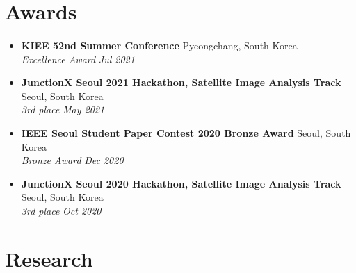\documentclass[10pt]{article}
\begin{document}

\section{ Awards }
\paragraph{}

\begin{itemize}[itemsep=4pt,topsep=0pt]
    \item \normalsize{\textbf{KIEE 52nd Summer Conference}} \normalsize{\hfill Pyeongchang, South Korea 
    \\    \textit{Excellence Award} \hfill \textit{Jul 2021}}
    \item \normalsize{\textbf{JunctionX Seoul 2021 Hackathon, Satellite Image Analysis Track}} \normalsize{\hfill Seoul, South Korea
    \\    \textit{3rd place} \hfill \textit{May 2021}}
    \item \normalsize{\textbf{IEEE Seoul Student Paper Contest 2020 Bronze Award}} \normalsize{\hfill Seoul, South Korea
    \\    \textit{Bronze Award} \hfill \textit{Dec 2020}}
    \item \normalsize{\textbf{JunctionX Seoul 2020 Hackathon, Satellite Image Analysis Track}} \normalsize{\hfill Seoul, South Korea
    \\    \textit{3rd place} \hfill \textit{Oct 2020}}
        \end{itemize}


\section{Research}
\paragraph{}
\end{document}
